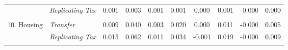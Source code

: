 \begin{tabular}{llcccccccc}
                     & \textit{Replicating Tax} & 0.001
& 0.003                    & 0.001
& 0.001                    & 0.000
& 0.001                    & -0.000
& 0.000                    \\ \\
10. Housing              & \textit{Transfer}        & 0.009           & 0.040              & 0.003           & 0.020              & 0.000           & 0.011              & -0.000           & 0.005              \\
                     & \textit{Replicating Tax} 
& 0.015             & 0.062
& 0.011             & 0.034
& -0.001             & 0.019
& -0.000             & 0.009 \\  \\ 
\hline
\hline 
\end{tabular}

